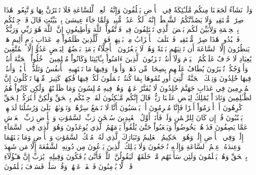 وَلَوۡ نَشَآءُ لَجَعَلۡنَا مِنكُم مَّلَـٰٓئِكَةٗ فِي ٱلۡأَرۡضِ يَخۡلُفُونَ
وَإِنَّهُۥ لَعِلۡمٞ لِّلسَّاعَةِ فَلَا تَمۡتَرُنَّ بِهَا وَٱتَّبِعُونِۚ هَٰذَا صِرَٰطٞ مُّسۡتَقِيمٞ
وَلَا يَصُدَّنَّكُمُ ٱلشَّيۡطَٰنُۖ إِنَّهُۥ لَكُمۡ عَدُوّٞ مُّبِينٞ
وَلَمَّا جَآءَ عِيسَىٰ بِٱلۡبَيِّنَٰتِ قَالَ قَدۡ جِئۡتُكُم بِٱلۡحِكۡمَةِ وَلِأُبَيِّنَ لَكُم بَعۡضَ ٱلَّذِي تَخۡتَلِفُونَ فِيهِۖ فَٱتَّقُواْ ٱللَّهَ وَأَطِيعُونِ
إِنَّ ٱللَّهَ هُوَ رَبِّي وَرَبُّكُمۡ فَٱعۡبُدُوهُۚ هَٰذَا صِرَٰطٞ مُّسۡتَقِيمٞ
فَٱخۡتَلَفَ ٱلۡأَحۡزَابُ مِنۢ بَيۡنِهِمۡۖ فَوَيۡلٞ لِّلَّذِينَ ظَلَمُواْ مِنۡ عَذَابِ يَوۡمٍ أَلِيمٍ
هَلۡ يَنظُرُونَ إِلَّا ٱلسَّاعَةَ أَن تَأۡتِيَهُم بَغۡتَةٗ وَهُمۡ لَا يَشۡعُرُونَ
ٱلۡأَخِلَّآءُ يَوۡمَئِذِۭ بَعۡضُهُمۡ لِبَعۡضٍ عَدُوٌّ إِلَّا ٱلۡمُتَّقِينَ
يَٰعِبَادِ لَا خَوۡفٌ عَلَيۡكُمُ ٱلۡيَوۡمَ وَلَآ أَنتُمۡ تَحۡزَنُونَ
ٱلَّذِينَ ءَامَنُواْ بِـَٔايَٰتِنَا وَكَانُواْ مُسۡلِمِينَ
ٱدۡخُلُواْ ٱلۡجَنَّةَ أَنتُمۡ وَأَزۡوَٰجُكُمۡ تُحۡبَرُونَ
يُطَافُ عَلَيۡهِم بِصِحَافٖ مِّن ذَهَبٖ وَأَكۡوَابٖۖ وَفِيهَا مَا تَشۡتَهِيهِ ٱلۡأَنفُسُ وَتَلَذُّ ٱلۡأَعۡيُنُۖ وَأَنتُمۡ فِيهَا خَٰلِدُونَ
وَتِلۡكَ ٱلۡجَنَّةُ ٱلَّتِيٓ أُورِثۡتُمُوهَا بِمَا كُنتُمۡ تَعۡمَلُونَ
لَكُمۡ فِيهَا فَٰكِهَةٞ كَثِيرَةٞ مِّنۡهَا تَأۡكُلُونَ
إِنَّ ٱلۡمُجۡرِمِينَ فِي عَذَابِ جَهَنَّمَ خَٰلِدُونَ
لَا يُفَتَّرُ عَنۡهُمۡ وَهُمۡ فِيهِ مُبۡلِسُونَ
وَمَا ظَلَمۡنَٰهُمۡ وَلَٰكِن كَانُواْ هُمُ ٱلظَّـٰلِمِينَ
وَنَادَوۡاْ يَٰمَٰلِكُ لِيَقۡضِ عَلَيۡنَا رَبُّكَۖ قَالَ إِنَّكُم مَّـٰكِثُونَ
لَقَدۡ جِئۡنَٰكُم بِٱلۡحَقِّ وَلَٰكِنَّ أَكۡثَرَكُمۡ لِلۡحَقِّ كَٰرِهُونَ
أَمۡ أَبۡرَمُوٓاْ أَمۡرٗا فَإِنَّا مُبۡرِمُونَ
أَمۡ يَحۡسَبُونَ أَنَّا لَا نَسۡمَعُ سِرَّهُمۡ وَنَجۡوَىٰهُمۚ بَلَىٰ وَرُسُلُنَا لَدَيۡهِمۡ يَكۡتُبُونَ
قُلۡ إِن كَانَ لِلرَّحۡمَٰنِ وَلَدٞ فَأَنَا۠ أَوَّلُ ٱلۡعَٰبِدِينَ
سُبۡحَٰنَ رَبِّ ٱلسَّمَٰوَٰتِ وَٱلۡأَرۡضِ رَبِّ ٱلۡعَرۡشِ عَمَّا يَصِفُونَ
فَذَرۡهُمۡ يَخُوضُواْ وَيَلۡعَبُواْ حَتَّىٰ يُلَٰقُواْ يَوۡمَهُمُ ٱلَّذِي يُوعَدُونَ
وَهُوَ ٱلَّذِي فِي ٱلسَّمَآءِ إِلَٰهٞ وَفِي ٱلۡأَرۡضِ إِلَٰهٞۚ وَهُوَ ٱلۡحَكِيمُ ٱلۡعَلِيمُ
وَتَبَارَكَ ٱلَّذِي لَهُۥ مُلۡكُ ٱلسَّمَٰوَٰتِ وَٱلۡأَرۡضِ وَمَا بَيۡنَهُمَا وَعِندَهُۥ عِلۡمُ ٱلسَّاعَةِ وَإِلَيۡهِ تُرۡجَعُونَ
وَلَا يَمۡلِكُ ٱلَّذِينَ يَدۡعُونَ مِن دُونِهِ ٱلشَّفَٰعَةَ إِلَّا مَن شَهِدَ بِٱلۡحَقِّ وَهُمۡ يَعۡلَمُونَ
وَلَئِن سَأَلۡتَهُم مَّنۡ خَلَقَهُمۡ لَيَقُولُنَّ ٱللَّهُۖ فَأَنَّىٰ يُؤۡفَكُونَ
وَقِيلِهِۦ يَٰرَبِّ إِنَّ هَـٰٓؤُلَآءِ قَوۡمٞ لَّا يُؤۡمِنُونَ
فَٱصۡفَحۡ عَنۡهُمۡ وَقُلۡ سَلَٰمٞۚ فَسَوۡفَ يَعۡلَمُونَ